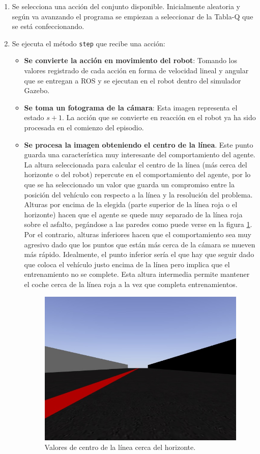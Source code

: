 \begin{enumerate}
    \item Se selecciona una acción del conjunto disponible. Inicialmente aleatoria y según va avanzando el programa se empiezan a seleccionar de la Tabla-Q que se está confeccionando.\\
    \item Se ejecuta el método \texttt{step} que recibe una acción:\\
    \begin{itemize}
        \item \textbf{Se convierte la acción en movimiento del robot}: Tomando los valores registrado de cada acción en forma de velocidad lineal y angular que se entregan a ROS y se ejecutan en el robot dentro del simulador Gazebo.\\
        \item \textbf{Se toma un fotograma de la cámara}: Esta imagen representa el estado $s+1$. La acción que se convierte en reacción en el robot ya ha sido procesada en el comienzo del episodio.\\
        \item \textbf{Se procesa la imagen obteniendo el centro de la línea}. Este punto guarda una característica muy interesante del comportamiento del agente. La altura seleccionada para calcular el centro de la línea (más cerca del horizonte o del robot) repercute en el comportamiento del agente, por lo que se ha seleccionado un valor que guarda un compromiso entre la posición del vehículo con respecto a la línea y la resolución del problema.\\
        
        Alturas por encima de la elegida (parte superior de la línea roja o el horizonte) hacen que el agente se quede muy separado de la línea roja sobre el asfalto, pegándose a las paredes como puede verse en la figura \ref{fig:distanciamiento-1}. Por el contrario, alturas inferiores hacen que el comportamiento sea muy agresivo dado que los puntos que están más cerca de la cámara se mueven más rápido. Idealmente, el punto inferior sería el que hay que seguir dado que coloca el vehículo justo encima de la línea pero implica que el entrenamiento no se complete. Esta altura intermedia permite mantener el coche cerca de la línea roja a la vez que completa entrenamientos.
        
        \begin{figure}[ht!]
            \centering \includegraphics[width=0.5\columnwidth]{./figures/chapter_4/ataque_recta.jpg}
            \caption{Valores de centro de la línea cerca del horizonte.}\label{fig:distanciamiento-1}
        \end{figure}
        

\end{itemize}
\end{enumerate}
